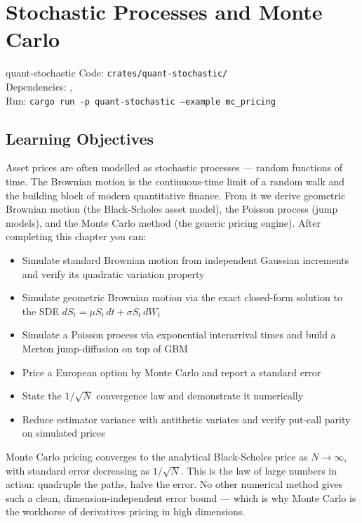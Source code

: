 \chapter{Stochastic Processes and Monte Carlo}
\label{ch:stochastic}

\begin{companioncode}{quant-stochastic}
Code: \texttt{crates/quant-stochastic/}\\
Dependencies: , \\
Run: \texttt{cargo run -p quant-stochastic --example mc\_pricing}
\end{companioncode}

\section{Learning Objectives}

Asset prices are often modelled as stochastic processes --- random functions
of time. The Brownian motion is the continuous-time limit of a random walk and
the building block of modern quantitative finance. From it we derive geometric
Brownian motion (the Black-Scholes asset model), the Poisson process (jump
models), and the Monte Carlo method (the generic pricing engine). After
completing this chapter you can:

\begin{itemize}
    \item Simulate standard Brownian motion from independent Gaussian
      increments and verify its quadratic variation property
    \item Simulate geometric Brownian motion via the exact closed-form
      solution to the SDE $dS_t = \mu S_t \, dt + \sigma S_t \, dW_t$
    \item Simulate a Poisson process via exponential interarrival times and
      build a Merton jump-diffusion on top of GBM
    \item Price a European option by Monte Carlo and report a standard error
    \item State the $1/\sqrt{N}$ convergence law and demonstrate it
      numerically
    \item Reduce estimator variance with antithetic variates and verify
      put-call parity on simulated prices
\end{itemize}

\begin{keyinsight}
Monte Carlo pricing converges to the analytical Black-Scholes price as
$N \to \infty$, with standard error decreasing as $1/\sqrt{N}$. This is the
law of large numbers in action: quadruple the paths, halve the error. No
other numerical method gives such a clean, dimension-independent error
bound --- which is why Monte Carlo is the workhorse of derivatives pricing
in high dimensions.
\end{keyinsight}

